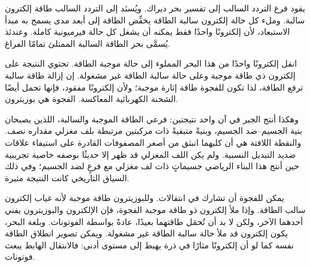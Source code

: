 يقود فرع التردد السالب إلى تفسير بحر ديراك. ويُسنَد إلى التردد السالب طاقة إلكترون سالبة. وملء كل حالة إلكترون سالبة الطاقة يخفِّض الطاقة إلى أبعد مدى يسمح به مبدأ الاستبعاد، لأن إلكترونًا واحدًا فقط يمكنه أن يشغل كل حالة فيرميونية كاملة. وعندئذ يُسمَّى بحر الطاقة السالبة الممتلئ تمامًا الفراغ.

انقل إلكترونًا واحدًا من هذا البحر المملوء إلى حالة موجبة الطاقة. تحتوي النتيجة على إلكترون ذي طاقة موجبة وعلى حالة سالبة الطاقة غير مشغولة. إن إزالة طاقة سالبة ترفع الطاقة، لذا تكون للفجوة طاقة إثارة موجبة؛ ولأن إلكترونًا مفقود، فإنها تحمل أيضًا الشحنة الكهربائية المعاكسة. الفجوة هي بوزيترون.

\begin{classroomqa}
\end{classroomqa}

وهكذا أنتج الجبر في آن واحد نتيجتين: فرعي الطاقة الموجبة والسالبة، اللذين يصبحان بنية الجسيم--ضد الجسيم، وبنيةً متبقيةً ذات مركبتين مرتبطة بلف مغزلي مقداره نصف. والنقطة اللافتة هي أن كليهما انبثق من أصغر المصفوفات القادرة على استيفاء علاقات ضديد التبديل النسبية. ولم يكن اللف المغزلي قد ظهر إلا حديثًا بوصفه خاصية تجريبية حين أنتج هذا البناء الرياضي جسيماتٍ ذات لف مغزلي مع فرعٍ لضد الجسيم؛ وفي ذلك السياق التاريخي كانت النتيجة مثيرة.

\begin{classroomqa}
\end{classroomqa}

يمكن للفجوة أن تشارك في انتقالات. وللبوزيترون طاقة موجبة لأنه غياب إلكترون سالب الطاقة. وإذا ملأ إلكترون ذو طاقة موجبة الفجوة، فإن الإلكترون والبوزيترون يفني أحدهما الآخر، ولكن لا بد أن تُحمَل طاقتهما بعيدًا، عادةً بواسطة الفوتونات. وبلغة البحر، يكون إلكترون قد ملأ حالة سالبة الطاقة غير مشغولة. ويمكن تصوير انطلاق الطاقة نفسه كما لو أن إلكترونًا مثارًا في ذرة يهبط إلى مستوى أدنى: فالانتقال الهابط يبعث فوتونات.

\begin{classroomqa}
\end{classroomqa}

